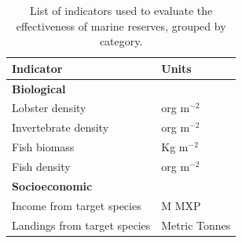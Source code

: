 \documentclass{frontiersSCNS}
\begin{document}
\begin{table}[H]

\caption{\label{tab:unnamed-chunk-10}\label{table:indicators}List of indicators used to evaluate the effectiveness of marine reserves, grouped by category.}
\centering
\begin{tabular}[t]{l|l}
\hline
Indicator & Units\\
\hline
\multicolumn{2}{l}{\textbf{Biological}}\\
\hline
\hspace{1em}Lobster density & org $\mathrm{m}^{-2}$\\
\hline
\hspace{1em}Invertebrate density & org $\mathrm{m}^{-2}$\\
\hline
\hspace{1em}Fish biomass & Kg $\mathrm{m}^{-2}$\\
\hline
\hspace{1em}Fish density & org $\mathrm{m}^{-2}$\\
\hline
\multicolumn{2}{l}{\textbf{Socioeconomic}}\\
\hline
\hspace{1em}Income from target species & M MXP\\
\hline
\hspace{1em}Landings from target species & Metric Tonnes\\
\hline
\end{tabular}
\end{table}
\end{document}
